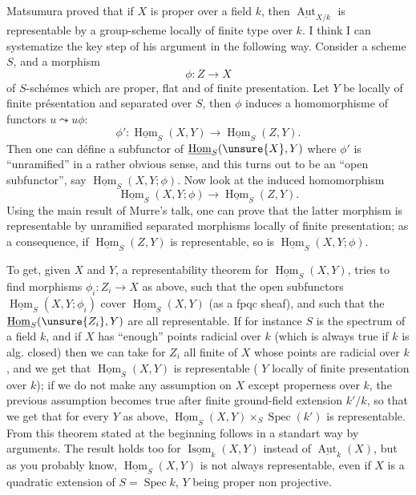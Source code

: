 Matsumura proved that if $X$ is proper over a field $k$, then $\underline{\operatorname{Aut}}_{X/k}$ is representable by a group-scheme locally of finite type over $k$. I think I can systematize the key step of his argument in the following way. Consider a scheme $S$, and a morphism
\[
\phi:Z\longrightarrow X
\]
of $S$-schémes which are proper, flat and of finite presentation. Let $Y$ be locally of finite présentation and separated over $S$, then $\phi$ induces a homomorphisme of functors $u\leadsto u\phi$:
\[
\phi':\underline{\operatorname{Hom}}_S(X,Y)\longrightarrow\underline{\operatorname{Hom}}_S(Z,Y).
\]
Then one can défine a subfunctor of $\underline{\operatorname{Hom}}_S(\unsure{X},Y)$ where $\phi'$ is ``unramified'' in a rather obvious sense, and this turns out to be an ``open subfunctor'', say $\underline{\operatorname{Hom}}_S(X,Y;\phi)$. Now look at the induced homomorphism
\[
\underline{\operatorname{Hom}}_S(X,Y;\phi)\longrightarrow\underline{\operatorname{Hom}}_S(Z,Y).
\]
Using the main result of Murre's talk, one can prove that the latter morphism is representable by unramified separated morphisms locally of finite presentation; as a consequence, if $\underline{\operatorname{Hom}}_S(Z,Y)$ is representable, so is $\underline{\operatorname{Hom}}_S(X,Y;\phi)$.

To get, given $X$ and $Y$, a representability theorem for $\underline{\operatorname{Hom}}_S(X,Y)$,  tries to find morphisms $\phi_i:Z_i\longrightarrow X$ as above, such that the open subfunctors $\underline{\operatorname{Hom}}_S(X,Y;\phi_i)$ cover $\underline{\operatorname{Hom}}_S(X,Y)$ (as a fpqc sheaf), and such that the  $\underline{\operatorname{Hom}}_S(\unsure{Z_i},Y)$ are all representable. If for instance $S$ is the spectrum of a field $k$, and if $X$ has ``enough'' points radicial over $k$ (which is always true if $k$ is alg. closed) then we can take for $Z_i$ all finite  of $X$ whose points are radicial over $k$, and we get
that $\underline{\operatorname{Hom}}_S(X,Y)$ is representable ( $Y$ locally of finite presentation  over $k$); if we do not make any assumption on $X$ except properness over $k$, the previous assumption becomes true after finite ground-field extension $k'/k$, so that we get that for every $Y$ as above, $\underline{\operatorname{Hom}}_S(X,Y)\times_S\operatorname{Spec}(k')$ is representable. From this  theorem stated at the beginning follows in a standart way by  arguments. The result holds too for $\underline{\operatorname{Isom}}_k(X,Y)$ instead of $\underline{\operatorname{Aut}}_k(X)$, but as you probably know, $\underline{\operatorname{Hom}}_S(X,Y)$ is not always representable, even if $X$ is a quadratic extension of $S=\operatorname{Spec}k$, $Y$ being proper non projective.

